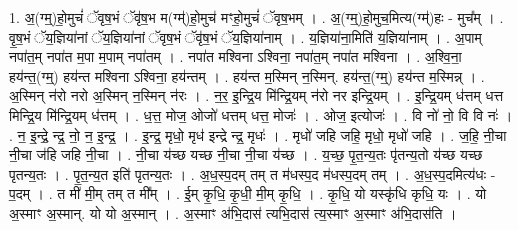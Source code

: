 \documentclass[17pt]{extarticle}
\begin{document}
1. अ॒(ग्म्॒)हो॒मुचं॑ ॅवृष॒भं ॅवृ॑ष॒भ म(ग्म्॑)हो॒मुच॑ मꣳहो॒मुचं॑ ॅवृष॒भम् । . अ॒(ग्म्॒)हो॒मुच॒मित्य(ग्म्॑)हः - मुच᳚म् । . वृ॒ष॒भं ॅय॒ज्ञिया॑नां ॅय॒ज्ञिया॑नां ॅवृष॒भं ॅवृ॑ष॒भं ॅय॒ज्ञिया॑नाम् । . य॒ज्ञिया॑ना॒मिति॑ य॒ज्ञिया॑नाम् । . अ॒पाम् नपा॑त॒म् नपा॑त म॒पा म॒पाम् नपा॑तम् । . नपा॑त मश्विना ऽश्विना॒ नपा॑त॒म् नपा॑त मश्विना । . अ॒श्वि॒ना॒ हय॑न्त॒(ग्म्॒) हय॑न्त मश्विना ऽश्विना॒ हय॑न्तम् । . हय॑न्त म॒स्मिन् न॒स्मिन्. हय॑न्त॒(ग्म्॒) हय॑न्त म॒स्मिन्न् । . अ॒स्मिन् न॑रो नरो अ॒स्मिन् न॒स्मिन् न॑रः । . न॒र॒ इ॒न्द्रि॒य मि॑न्द्रि॒यम् न॑रो नर इन्द्रि॒यम् । . इ॒न्द्रि॒यम् ध॑त्तम् धत्त मिन्द्रि॒य मि॑न्द्रि॒यम् ध॑त्तम् । . ध॒त्त॒ मोज॒ ओजो॑ धत्तम् धत्त॒ मोजः॑ । . ओज॒ इत्योजः॑ । . वि नो॑ नो॒ वि वि नः॑ । . न॒ इ॒न्द्रे॒ न्द्र॒ नो॒ न॒ इ॒न्द्र॒ । . इ॒न्द्र॒ मृधो॒ मृध॑ इन्द्रे न्द्र॒ मृधः॑ । . मृधो॑ जहि जहि॒ मृधो॒ मृधो॑ जहि । . ज॒हि॒ नी॒चा नी॒चा ज॑हि जहि नी॒चा । . नी॒चा य॑च्छ यच्छ नी॒चा नी॒चा य॑च्छ । . य॒च्छ॒ पृ॒त॒न्य॒तः पृ॑तन्य॒तो य॑च्छ यच्छ पृतन्य॒तः । . पृ॒त॒न्य॒त इति॑ पृतन्य॒तः । . अ॒ध॒स्प॒दम् तम् त म॑धस्प॒द म॑धस्प॒दम् तम् । . अ॒ध॒स्प॒दमित्य॑धः - प॒दम् । . त मी॑ मी॒म् तम् त मी᳚म् । . ई॒म् कृ॒धि॒ कृ॒धी॒ मी॒म् कृ॒धि॒ । . कृ॒धि॒ यो यस्कृ॑धि कृधि॒ यः । . यो अ॒स्माꣳ अ॒स्मान्. यो यो अ॒स्मान् । . अ॒स्माꣳ अ॑भि॒दास॑ त्यभि॒दास॑ त्य॒स्माꣳ अ॒स्माꣳ अ॑भि॒दास॑ति । \newline
\end{document}
